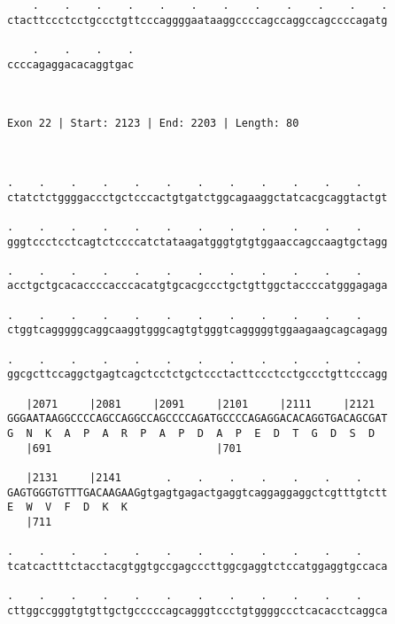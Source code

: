 \documentclass{article}
\begin{document}
\begin{Verbatim}
    .    .    .    .    .    .    .    .    .    .    .    .
ctacttccctcctgccctgttcccaggggaataaggccccagccaggccagccccagatg
                                                            
    .    .    .    .
ccccagaggacacaggtgac
                    
                    
 
Exon 22 | Start: 2123 | End: 2203 | Length: 80



.    .    .    .    .    .    .    .    .    .    .    .    
ctatctctggggaccctgctcccactgtgatctggcagaaggctatcacgcaggtactgt
                                                            
.    .    .    .    .    .    .    .    .    .    .    .    
gggtccctcctcagtctccccatctataagatgggtgtgtggaaccagccaagtgctagg
                                                            
.    .    .    .    .    .    .    .    .    .    .    .    
acctgctgcacaccccacccacatgtgcacgccctgctgttggctaccccatgggagaga
                                                            
.    .    .    .    .    .    .    .    .    .    .    .    
ctggtcagggggcaggcaaggtgggcagtgtgggtcagggggtggaagaagcagcagagg
                                                            
.    .    .    .    .    .    .    .    .    .    .    .    
ggcgcttccaggctgagtcagctcctctgctccctacttccctcctgccctgttcccagg
                                                            
   |2071     |2081     |2091     |2101     |2111     |2121  
GGGAATAAGGCCCCAGCCAGGCCAGCCCCAGATGCCCCAGAGGACACAGGTGACAGCGAT
G  N  K  A  P  A  R  P  A  P  D  A  P  E  D  T  G  D  S  D  
   |691                          |701                       
  
   |2131     |2141       .    .    .    .    .    .    .    
GAGTGGGTGTTTGACAAGAAGgtgagtgagactgaggtcaggaggaggctcgtttgtctt
E  W  V  F  D  K  K                                         
   |711                                                     
  
.    .    .    .    .    .    .    .    .    .    .    .    
tcatcactttctacctacgtggtgccgagcccttggcgaggtctccatggaggtgccaca
                                                            
.    .    .    .    .    .    .    .    .    .    .    .    
cttggccgggtgtgttgctgcccccagcagggtccctgtggggccctcacacctcaggca
                                                            

\end{Verbatim}
\end{document}
